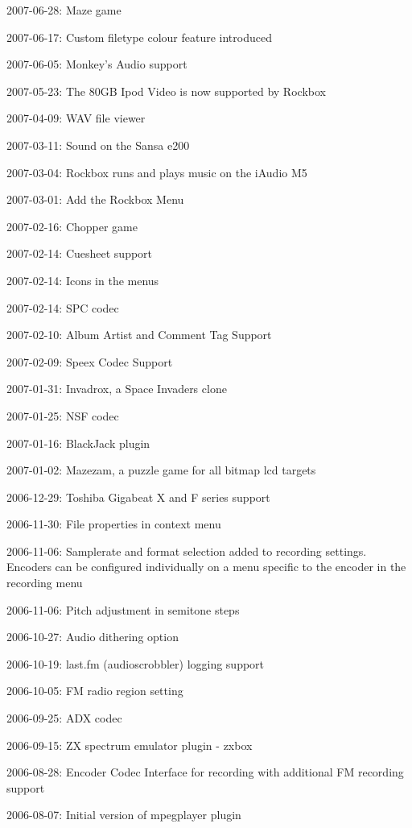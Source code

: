 \begin{changelog}
\item 2007-06-28: Maze game
\item 2007-06-17: Custom filetype colour feature introduced 
\item 2007-06-05: Monkey's Audio support
\item 2007-05-23: The 80GB Ipod Video is now supported by Rockbox
\item 2007-04-09: WAV file viewer
\item 2007-03-11: Sound on the Sansa e200
\item 2007-03-04: Rockbox runs and plays music on the iAudio M5
\item 2007-03-01: Add the Rockbox Menu
\item 2007-02-16: Chopper game
\item 2007-02-14: Cuesheet support
\item 2007-02-14: Icons in the menus
\item 2007-02-14: SPC codec
\item 2007-02-10: Album Artist and Comment Tag Support
\item 2007-02-09: Speex Codec Support
\item 2007-01-31: Invadrox, a Space Invaders clone
\item 2007-01-25: NSF codec
\item 2007-01-16: BlackJack plugin
\item 2007-01-02: Mazezam, a puzzle game for all bitmap lcd targets
\item 2006-12-29: Toshiba Gigabeat X and F series support
\item 2006-11-30: File properties in context menu
\item 2006-11-06: Samplerate and format selection added to recording
  settings. Encoders can be configured individually on a menu specific
  to the encoder in the recording menu
\item 2006-11-06: Pitch adjustment in semitone steps
\item 2006-10-27: Audio dithering option
\item 2006-10-19: last.fm (audioscrobbler) logging support
\item 2006-10-05: FM radio region setting
\item 2006-09-25: ADX codec
\item 2006-09-15: ZX spectrum emulator plugin - zxbox
\item 2006-08-28: Encoder Codec Interface for recording with
  additional FM recording support
\item 2006-08-07: Initial version of mpegplayer plugin

\end{changelog}
